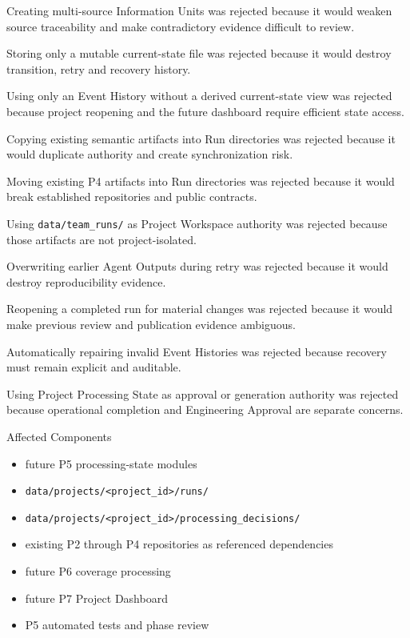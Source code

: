 Creating multi-source Information Units was rejected because it would weaken source traceability and make contradictory evidence difficult to review.

Storing only a mutable current-state file was rejected because it would destroy transition, retry and recovery history.

Using only an Event History without a derived current-state view was rejected because project reopening and the future dashboard require efficient state access.

Copying existing semantic artifacts into Run directories was rejected because it would duplicate authority and create synchronization risk.

Moving existing P4 artifacts into Run directories was rejected because it would break established repositories and public contracts.

Using \texttt{data/team\_runs/} as Project Workspace authority was rejected because those artifacts are not project-isolated.

Overwriting earlier Agent Outputs during retry was rejected because it would destroy reproducibility evidence.

Reopening a completed run for material changes was rejected because it would make previous review and publication evidence ambiguous.

Automatically repairing invalid Event Histories was rejected because recovery must remain explicit and auditable.

Using Project Processing State as approval or generation authority was rejected because operational completion and Engineering Approval are separate concerns.

Affected Components

\begin{itemize}
\tightlist
\item
  future P5 processing-state modules
\item
  \texttt{data/projects/\textless{}project\_id\textgreater{}/runs/}
\item
  \texttt{data/projects/\textless{}project\_id\textgreater{}/processing\_decisions/}
\item
  existing P2 through P4 repositories as referenced dependencies
\item
  future P6 coverage processing
\item
  future P7 Project Dashboard
\item
  P5 automated tests and phase review
\end{itemize}

